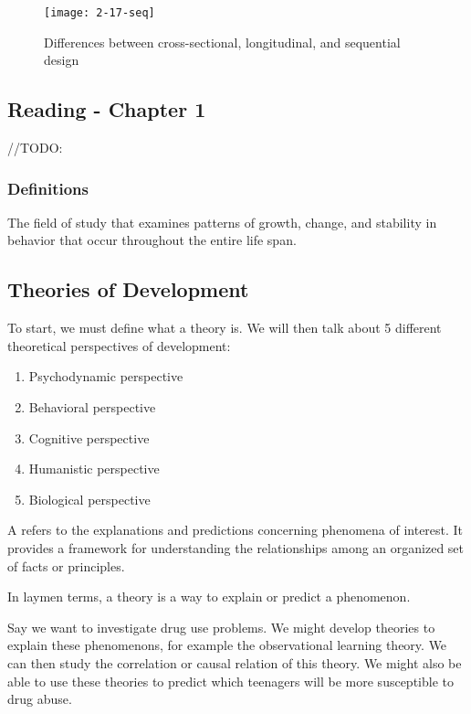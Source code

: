 \documentclass[../main/main.tex]{subfiles}
\begin{document}
\begin{figure}[htpb]
  \centering
  \texttt{[image: 2-17-seq]}
  \caption{Differences between cross-sectional, longitudinal, and sequential design}
\end{figure}

\subsection{Reading - Chapter 1}
//TODO:
\subsubsection{Definitions}
\begin{definition}
The field of study that examines patterns of growth, change, and stability in behavior that occur throughout the entire life span.
\end{definition}


\subsection{Theories of Development}
To start, we must define what a theory is. We will then talk about 5 different theoretical perspectives of development:
\begin{enumerate}
  \item Psychodynamic perspective
  \item Behavioral perspective
  \item Cognitive perspective
  \item Humanistic perspective
  \item Biological perspective
\end{enumerate}

\begin{definition}
A  refers to the explanations and predictions concerning phenomena of interest. It provides a framework for understanding the relationships among an organized set of facts or principles. 
\end{definition}
\begin{remark}
In laymen terms, a theory is a way to explain or predict a phenomenon.
\end{remark}
\begin{example}
Say we want to investigate drug use problems. We might develop theories to explain these phenomenons, for example the observational learning theory. We can then study the correlation or causal relation of this theory. We might also be able to use these theories to predict which teenagers will be more susceptible to drug abuse.
\end{example}
\end{document}
